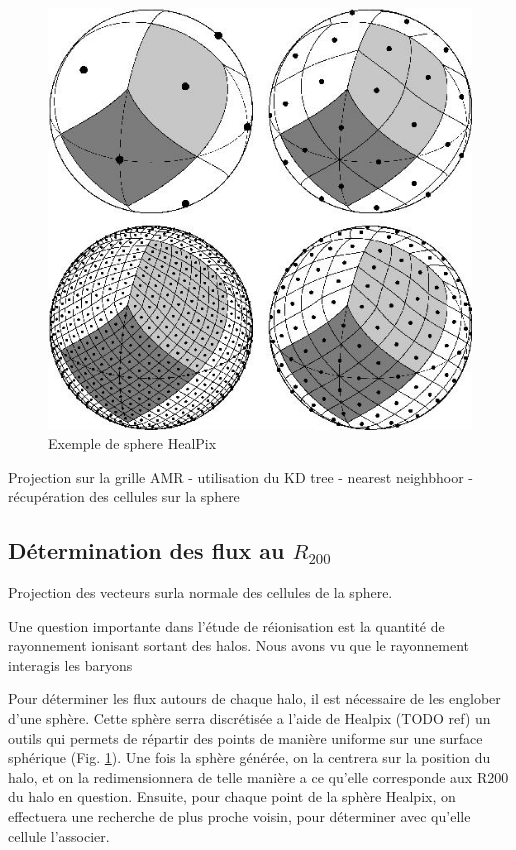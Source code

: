 \begin{figure}[bth]
        \includegraphics[width=.95\linewidth]{img/03/healpix.jpg} 
        \caption{Exemple de sphere HealPix}
 		\label{fig:HealPix}
\end{figure}

Projection sur la grille AMR
 - utilisation du KD tree
 - nearest neighbhoor
 - récupération des cellules sur la sphere
 

\subsection{Détermination des flux au $R_{200}$}
\label{sec:healpix}

Projection des vecteurs surla normale des cellules de la sphere.

Une question importante dans l’étude de réionisation est la quantité de rayonnement ionisant sortant des halos.
Nous avons vu que le rayonnement interagis les baryons


Pour déterminer les flux autours de chaque halo, il est nécessaire de les englober d'une sphère.
Cette sphère serra discrétisée a l'aide de Healpix (TODO ref) un outils qui permets de répartir des points de manière uniforme sur une surface sphérique (Fig. \ref{fig:HealPix}).
Une fois la sphère générée, on la centrera sur la position du halo, et on la redimensionnera de telle manière a ce qu'elle corresponde aux R200 du halo en question.
Ensuite, pour chaque point de la sphère Healpix, on effectuera une recherche de plus proche voisin, pour déterminer avec qu'elle cellule l'associer.

